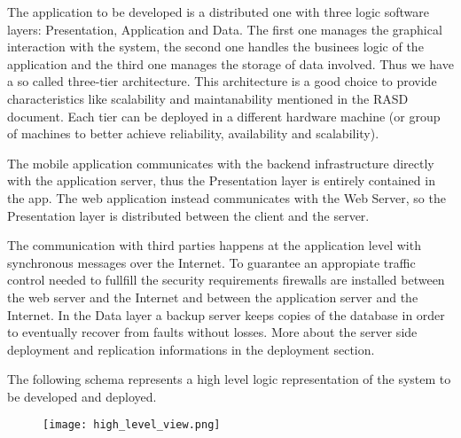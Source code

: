 The application to be developed is a distributed one with three logic software layers: Presentation, Application and Data. The first one manages the graphical interaction with the system, the second one handles the businees logic of the application and the third one manages the storage of data involved. Thus we have a so called three-tier architecture. This architecture is a good choice to provide characteristics like scalability and maintanability mentioned in the RASD document. Each tier can be deployed in a different hardware machine (or group of machines to better achieve reliability, availability and scalability).

The mobile application communicates with the backend infrastructure directly with the application server, thus the Presentation layer is entirely contained in the app. The web application instead communicates with the Web Server, so the Presentation layer is distributed between the client and the server. 

The communication with third parties happens at the application level with synchronous messages over the Internet. To guarantee an appropiate traffic control needed to fullfill the security requirements firewalls are installed between the web server and the Internet and between the application server and the Internet. In the Data layer a backup server keeps copies of the database in order to eventually recover from faults without losses. More about the server side deployment and replication informations in the deployment section.

The following schema represents a high level logic representation of the system to be developed and deployed.

\begin{figure}[H]
    \centering
    \texttt{[image: high\_level\_view.png]}
\end{figure}